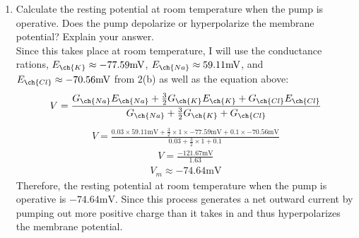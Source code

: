 \documentclass[11pt]{article}
\begin{document}
\begin{enumerate}[label=\arabic*.]
\begin{enumerate}[label=(\alph*)]
\newpage
\item
Calculate the resting potential at room temperature when the pump is operative. Does the pump depolarize or hyperpolarize the membrane potential? Explain your answer.
\vspace*{1\baselineskip}
\\
Since this takes place at room temperature, I will use the conductance rations, $E_{\ch{K}} \approx -77.59 \text{mV}$, $E_{\ch{Na}} \approx 59.11 \text{mV}$, and $E_{\ch{Cl}} \approx -70.56 \text{mV}$ from $2$(b) as well as the equation above:
\begin{align*}
V = \frac{G_{\ch{Na}} E_{\ch{Na}} + \frac{3} {2} G_{\ch{K}} E_{\ch{K}} + G_{\ch{Cl}} E_{\ch{Cl}}} {G_{\ch{Na}} + \frac{3} {2} G_{\ch{K}} + G_{\ch{Cl}}}
\end{align*}
\begin{align*}
V = \frac{0.03 \times 59.11 \text{mV} + \frac{3} {2} \times 1 \times -77.59 \text{mV} + 0.1 \times -70.56 \text{mV}} {0.03 + \frac{3} {2} \times 1 + 0.1}
\end{align*}
\begin{align*}
V = \frac{-121.67 \text{mV}} {1.63}
\end{align*}
\begin{align*}
V_m \approx -74.64 \text{mV}
\end{align*}
Therefore, the resting potential at room temperature when the pump is operative is $-74.64 \text{mV}$. Since this process generates a net outward current by pumping out more positive charge than it takes in and thus hyperpolarizes the membrane potential.




\end{enumerate}
\end{enumerate}
\end{document}
